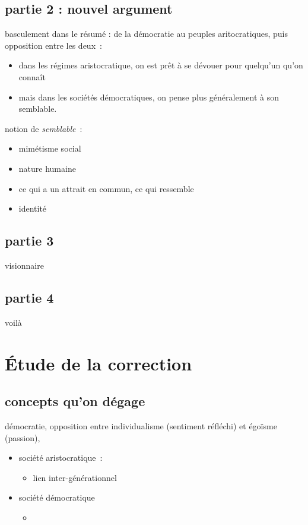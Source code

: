 \subsection{partie 2 : nouvel argument}


basculement dans le résumé : de la démocratie au peuples aritocratiques, puis opposition entre les deux~:
\begin{itemize}
    \item dans les régimes aristocratique, on est prêt à se dévouer pour quelqu'un qu'on connaît
    \item mais dans les sociétés démocratiques, on pense plus généralement à son semblable.
\end{itemize}

notion de  \textit{semblable}~:
\begin{itemize}
    \item mimétisme social
    \item nature humaine
    \item ce qui a un attrait en commun, ce qui ressemble
    \item identité
\end{itemize}

\subsection{partie 3}

visionnaire

\subsection{partie 4}

voilà

\section{Étude de la correction}

\subsection{concepts qu'on dégage}

démocratie, opposition entre individualisme (sentiment réfléchi) et égoïsme (passion),
\begin{itemize}
    \item société aristocratique~:
    \begin{itemize}
        \item lien inter-générationnel
    \end{itemize}
    \item société démocratique
    \begin{itemize}
        \item 
    \end{itemize}
\end{itemize}

